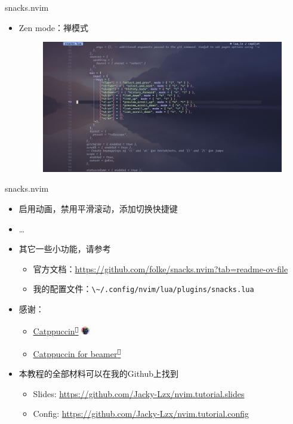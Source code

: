 \documentclass[aspectratio=169]{ctexbeamer}
\newcommand{\nerd}[1]{\texttt{#1}}
\newcommand{\link}[3][]{\href{#3}{#2\textsuperscript{\nerd{}}}}
\begin{document}
  \begin{frame}{snacks.nvim}
    \begin{itemize}
      \item Zen mode：禅模式
        \begin{figure}[H]
          \centering
          \includegraphics[width=0.7\linewidth]{./Figures/Snacks_Config_11_Zen.jpg}
        \end{figure}
    \end{itemize}
  \end{frame}

  \begin{frame}{snacks.nvim}
    \begin{itemize}
      \item 启用动画，禁用平滑滚动，添加切换快捷键
      \item \dots
      \item 其它一些小功能，请参考
        \begin{itemize}
          \item 官方文档：\url{https://github.com/folke/snacks.nvim?tab=readme-ov-file}
          \item 我的配置文件：\lstinline[language={}, style=path]{\~/.config/nvim/lua/plugins/snacks.lua}
        \end{itemize}
    \end{itemize}
  \end{frame}

  \begin{frame}
    \begin{itemize}
      \item 感谢：
        \begin{itemize}
          \item \link{Catppuccin}{https://catppuccin.com/} \includegraphics[height=10pt]{./Figures/Catppuccin_logo.png}
          \item \link{Catppuccin for beamer}{https://github.com/atticus-sullivan/beamercolortheme}
        \end{itemize}
        \vspace{0.5cm}
      \item 本教程的全部材料可以在我的Github上找到
        \begin{itemize}
          \item Slides: \url{https://github.com/Jacky-Lzx/nvim.tutorial.slides}
          \item Config: \url{https://github.com/Jacky-Lzx/nvim.tutorial.config}
        \end{itemize}
    \end{itemize}
  \end{frame}
\end{document}
